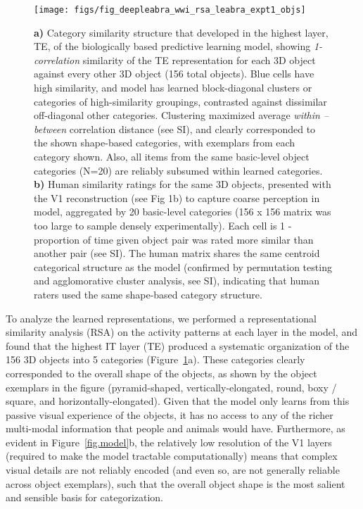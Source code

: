 \documentclass[11pt,twoside]{article}
\newif\myifpdf
\begin{document}
\begin{figure}
  \centering\texttt{[image: figs/fig\_deepleabra\_wwi\_rsa\_leabra\_expt1\_objs]}
  \caption{{\bf a)} Category similarity structure that developed in the highest layer, TE, of the biologically based predictive learning model, showing \emph{1-correlation} similarity of the TE representation for each 3D object against every other 3D object (156 total objects). Blue cells have high similarity, and model has learned block-diagonal clusters or categories of high-similarity groupings, contrasted against dissimilar off-diagonal other categories.  Clustering maximized average \emph{within -- between} correlation distance (see SI), and clearly corresponded to the shown shape-based categories, with exemplars from each category shown.  Also, all items from the same basic-level object categories (N=20) are reliably subsumed within learned categories. {\bf b)} Human similarity ratings for the same 3D objects, presented with the V1 reconstruction (see Fig 1b) to capture coarse perception in model, aggregated by 20 basic-level categories (156 x 156 matrix was too large to sample densely experimentally).  Each cell is 1 - proportion of time given object pair was rated more similar than another pair (see SI).  The human matrix shares the same centroid categorical structure as the model (confirmed by permutation testing and agglomorative cluster analysis, see SI), indicating that human raters used the same shape-based category structure.}
  \label{fig.rsa}
\end{figure}

To analyze the learned representations, we performed a representational similarity analysis (RSA) on the activity patterns at each layer in the model, and found that the highest IT layer (TE) produced a systematic organization of the 156 3D objects into 5 categories (Figure~\ref{fig.rsa}a).  These categories clearly corresponded to the overall shape of the objects, as shown by the object exemplars in the figure (pyramid-shaped, vertically-elongated, round, boxy / square, and horizontally-elongated).  Given that the model only learns from this passive visual experience of the objects, it has no access to any of the richer multi-modal information that people and animals would have.  Furthermore, as evident in Figure~\ref{fig.model}b, the relatively low resolution of the V1 layers (required to make the model tractable computationally) means that complex visual details are not reliably encoded (and even so, are not generally reliable across object exemplars), such that the overall object shape is the most salient and sensible basis for categorization.
\end{document}

